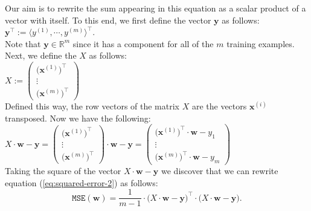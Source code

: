 Our aim is to rewrite the sum appearing in this equation as a scalar product of a vector with
itself.  To this end, we first define the vector $\mathbf{y}$ as follows:
\\[0.2cm]
\hspace*{1.3cm}
$\mathbf{y}^\top := \langle y^{(1)}, \cdots, y^{(m)} \rangle^\top$.
\\[0.2cm]
Note that $\mathbf{y} \in \mathbb{R}^m$ since it has a component for all of the $m$ training
examples.  Next, we define the  $X$ as follows:
\\[0.2cm]
\hspace*{1.3cm}
$X := \left(
  \begin{array}{c}
    \bigl(\mathbf{x}^{(1)}\bigr)^\top  \\
    \vdots                         \\
    \bigl(\mathbf{x}^{(m)}\bigr)^\top
  \end{array}
  \right)   
$
\\[0.2cm]
Defined this way, the row vectors of the matrix $X$ are the vectors $\mathbf{x}^{(i)}$ transposed.
Now we have the following:
\\[0.2cm]
\hspace*{1.3cm}
$X \cdot \mathbf{w} - \mathbf{y} = \left(
  \begin{array}{c}
    \bigl(\mathbf{x}^{(1)}\bigr)^\top  \\
    \vdots                         \\
    \bigl(\mathbf{x}^{(m)}\bigr)^\top
  \end{array}
  \right) \cdot \mathbf{w} - \mathbf{y} = \left(
  \begin{array}{c}
    \bigl(\mathbf{x}^{(1)}\bigr)^\top \cdot \mathbf{w} - y_1 \\
    \vdots                         \\
    \bigl(\mathbf{x}^{(m)}\bigr)^\top \cdot \mathbf{w} - y_m
  \end{array}
  \right)
$
\\[0.2cm]
Taking the square of the vector $X \cdot \mathbf{w} - \mathbf{y}$ we discover that
we can rewrite equation (\ref{eq:squared-error-2}) as follows:
\begin{equation}
  \label{eq:squared-error-3}
  \mathtt{MSE}(\mathbf{w}) = \frac{1}{m-1} \cdot \bigl(X \cdot \mathbf{w} - \textbf{y}\bigr)^\top \cdot 
                                            \bigl(X \cdot \mathbf{w} - \textbf{y}\bigr).
\end{equation}

